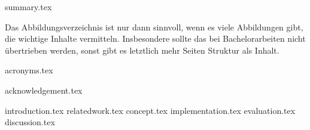 \documentclass[ncs,12pt,oneside,german,listof=totoc]{YY_Styles/abschlussarbeit}
\begin{document}
%
%
\renewcommand{\baselinestretch}{1.08}

\thispagestyle{empty}
\newpage
\thispagestyle{empty}
\cleardoublepage
\thispagestyle{empty}

%
\renewcommand{\baselinestretch}{1.08}
%

%
{summary.tex}
%
\setcounter{secnumdepth}{3}
\setcounter{tocdepth}{2}
\tableofcontents
%
%
%
\cleardoublepage
{} \label{listoffigures}
\listoffigures
Das Abbildungsverzeichnis ist nur dann sinnvoll, wenn es viele Abbildungen gibt, die wichtige Inhalte vermitteln. Insbesondere sollte das bei Bachelorarbeiten nicht übertrieben werden, sonst gibt es letztlich mehr Seiten Struktur als Inhalt.
%
\cleardoublepage
{} \label{listoftables}
\listoftables
%
\cleardoublepage
\renewcommand{\aclabelfont}[1]{\normalfont{\normalsize{#1}}\hfill}
 \label{listofacronyms}
{acronyms.tex}
%
\cleardoublepage
{} \label{acknowledgement}
{acknowledgement.tex}


\begin{mainmatter}

{introduction.tex}
{relatedwork.tex}
{concept.tex}
{implementation.tex}
{evaluation.tex}
{discussion.tex}

\cleardoublepage
{} \label{bibliography}



\end{mainmatter}

\end{document}
